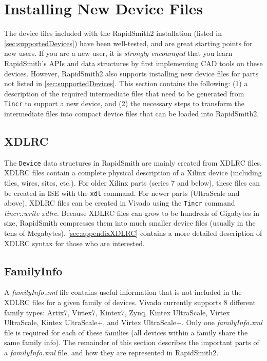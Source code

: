 \newpage
\section{Installing New Device Files}
The device files included with the RapidSmith2 installation (listed in
\autoref{sec:supportedDevices}) have been well-tested, and are great starting
points for new users. If you are a new user, it is \emph{strongly encouraged}
that you learn RapidSmith's APIs and data structures by first implementing CAD tools on
these devices. However, RapidSmith2 also supports installing new device files
for parts not listed in \autoref{sec:supportedDevices}. This section contains
the following: (1) a description of the required intermediate files that need to be
generated from \texttt{Tincr} to support a new device, and (2) the necessary
steps to transform the intermediate files into compact device files that can be
loaded into RapidSmith2.

\subsection {XDLRC}
The \texttt{Device} data structures in RapidSmith are mainly created from XDLRC
files. XDLRC files contain a complete physical description of a Xilinx device
(including tiles, wires, sites, etc.). For older Xilinx parts (series 7 and
below), these files can be created in ISE with the \texttt{xdl} command. For
newer parts (UltraScale and above), XDLRC files can be created in Vivado using
the \texttt{Tincr} command \textit{tincr::write xdlrc}. Because XDLRC files can
grow to be hundreds of Gigabytes in size, RapidSmith compresses them into much smaller device files
(usually in the tens of Megabytes). \autoref{sec:appendixXDLRC} contains a more
detailed description of XDLRC syntax for those who are interested.

\subsection{FamilyInfo}
A \textit{familyInfo.xml} file contains useful information that is
not included in the XDLRC files for a given family of devices. Vivado currently 
supports 8 different family types: Artix7, Virtex7, Kintex7, Zynq, Kintex
UltraScale, Virtex UltraScale, Kintex UltraScale+, and Virtex UltraScale+. Only
one \textit{familyInfo.xml} file is required for each of these families (all 
devices within a family share the same family info). The remainder of this
section describes the important parts of a \textit{familyInfo.xml} file, and how
they are represented in RapidSmith2.

